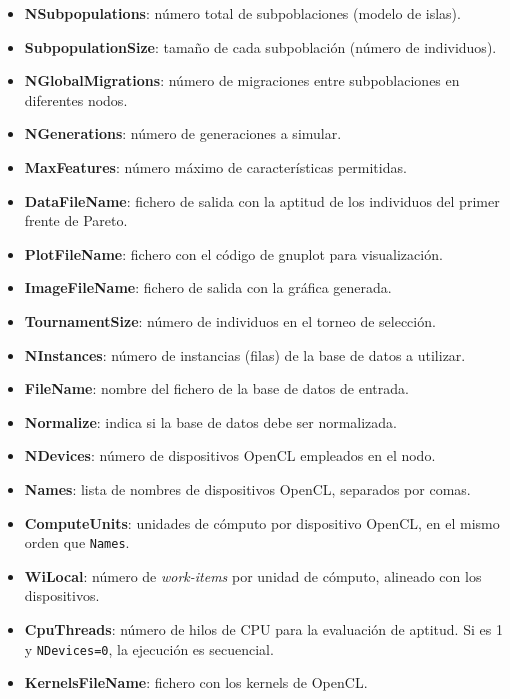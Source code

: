 \begin{itemize}
    \item \textbf{NSubpopulations}: número total de subpoblaciones (modelo de islas).
    \item \textbf{SubpopulationSize}: tamaño de cada subpoblación (número de individuos).
    \item \textbf{NGlobalMigrations}: número de migraciones entre subpoblaciones en diferentes nodos.
    \item \textbf{NGenerations}: número de generaciones a simular.
    \item \textbf{MaxFeatures}: número máximo de características permitidas.
    \item \textbf{DataFileName}: fichero de salida con la aptitud de los individuos del primer frente de Pareto.
    \item \textbf{PlotFileName}: fichero con el código de gnuplot para visualización.
    \item \textbf{ImageFileName}: fichero de salida con la gráfica generada.
    \item \textbf{TournamentSize}: número de individuos en el torneo de selección.
    \item \textbf{NInstances}: número de instancias (filas) de la base de datos a utilizar.
    \item \textbf{FileName}: nombre del fichero de la base de datos de entrada.
    \item \textbf{Normalize}: indica si la base de datos debe ser normalizada.
    \item \textbf{NDevices}: número de dispositivos OpenCL empleados en el nodo.
    \item \textbf{Names}: lista de nombres de dispositivos OpenCL, separados por comas.
    \item \textbf{ComputeUnits}: unidades de cómputo por dispositivo OpenCL, en el mismo orden que \texttt{Names}.
    \item \textbf{WiLocal}: número de \textit{work-items} por unidad de cómputo, alineado con los dispositivos.
    \item \textbf{CpuThreads}: número de hilos de CPU para la evaluación de aptitud. Si es 1 y \texttt{NDevices=0}, la ejecución es secuencial.
    \item \textbf{KernelsFileName}: fichero con los kernels de OpenCL.
\end{itemize}

